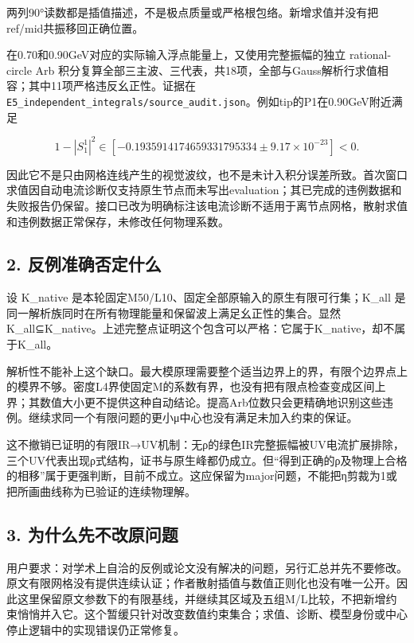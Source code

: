 \documentclass[
  11pt,
  a4paper,
]{article}
\begin{document}
两列90°读数都是插值描述，不是极点质量或严格根包络。新增求值并没有把ref/mid共振移回正确位置。

在0.70和0.90GeV对应的实际输入浮点能量上，又使用完整振幅的独立
rational-circle Arb
积分复算全部三主波、三代表，共18项，全部与Gauss解析行求值相容；其中11项严格违反幺正性。证据在
\texttt{E5\_independent\_integrals/source\_audit.json}。例如tip的P1在0.90GeV附近满足

\[
1-|S_1^1|^2\in[-0.1935914174659331795334\pm9.17\times10^{-23}]<0.
\]

因此它不是只由网格连线产生的视觉波纹，也不是未计入积分误差所致。首次窗口求值因自动电流诊断仅支持原生节点而未写出evaluation；其已完成的违例数据和失败报告仍保留。接口已改为明确标注该电流诊断不适用于离节点网格，散射求值和违例数据正常保存，未修改任何物理系数。

\subsection{2.
反例准确否定什么}\label{ux53cdux4f8bux51c6ux786eux5426ux5b9aux4ec0ux4e48}

设 K\_native 是本轮固定M50/L10、固定全部原输入的原生有限可行集；K\_all
是同一解析族同时在所有物理能量和保留波上满足幺正性的集合。显然
K\_all⊆K\_native。上述完整点证明这个包含可以严格：它属于K\_native，却不属于K\_all。

解析性不能补上这个缺口。最大模原理需要整个适当边界上的界，有限个边界点上的模界不够。密度L4界使固定M的系数有界，也没有把有限点检查变成区间上界；其数值大小更不提供这种自动结论。提高Arb位数只会更精确地识别这些违例。继续求同一个有限问题的更小μ中心也没有满足未加入约束的保证。

这不撤销已证明的有限IR→UV机制：无ρ的绿色IR完整振幅被UV电流扩展排除，三个UV代表出现ρ式结构，证书与原生峰都仍成立。但``得到正确的ρ及物理上合格的相移''属于更强判断，目前不成立。这应保留为major问题，不能把η剪裁为1或把所画曲线称为已验证的连续物理解。

\subsection{3.
为什么先不改原问题}\label{ux4e3aux4ec0ux4e48ux5148ux4e0dux6539ux539fux95eeux9898}

用户要求：对学术上自洽的反例或论文没有解决的问题，另行汇总并先不要修改。原文有限网格没有提供连续认证；作者散射插值与数值正则化也没有唯一公开。因此这里保留原文参数下的有限基线，并继续其区域及五组M/L比较，不把新增约束悄悄并入它。这个暂缓只针对改变数值约束集合；求值、诊断、模型身份或中心停止逻辑中的实现错误仍正常修复。
\end{document}
